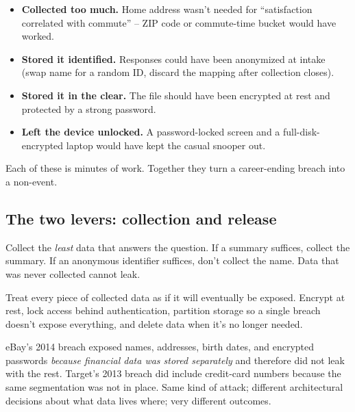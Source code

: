 \documentclass[11pt]{article}
\begin{document}
\begin{examplebox}
\begin{itemize}[leftmargin=*,noitemsep]
    \item \textbf{Collected too much.} Home address wasn't needed for
          ``satisfaction correlated with commute'' -- ZIP code or
          commute-time bucket would have worked.
    \item \textbf{Stored it identified.} Responses could have been
          anonymized at intake (swap name for a random ID, discard the
          mapping after collection closes).
    \item \textbf{Stored it in the clear.} The file should have been
          encrypted at rest and protected by a strong password.
    \item \textbf{Left the device unlocked.} A password-locked screen
          and a full-disk-encrypted laptop would have kept the casual
          snooper out.
\end{itemize}
Each of these is minutes of work. Together they turn a career-ending
breach into a non-event.
\end{examplebox}

\subsection{The two levers: collection and release}

\begin{defnbox}
Collect the \emph{least} data that answers the question. If a
summary suffices, collect the summary. If an anonymous identifier
suffices, don't collect the name. Data that was never collected
cannot leak.
\end{defnbox}

\begin{defnbox}
Treat every piece of collected data as if it will eventually be
exposed. Encrypt at rest, lock access behind authentication, partition
storage so a single breach doesn't expose everything, and delete data
when it's no longer needed.
\end{defnbox}

\begin{notebox}
eBay's 2014 breach exposed names, addresses, birth dates, and
encrypted passwords \emph{because financial data was stored
separately} and therefore did not leak with the rest. Target's 2013
breach did include credit-card numbers because the same segmentation
was not in place. Same kind of attack; different architectural
decisions about what data lives where; very different outcomes.
\end{notebox}
\end{document}
